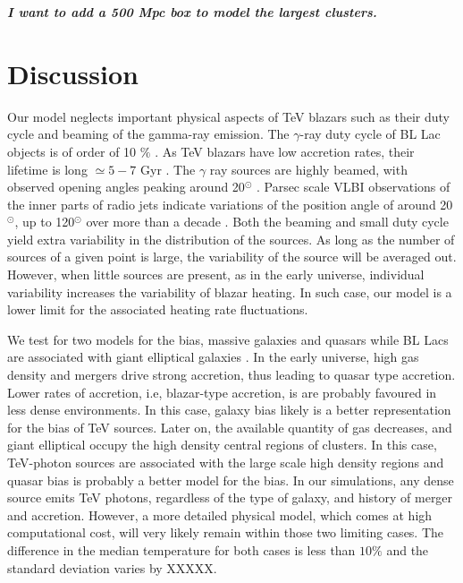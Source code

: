 \documentclass[twocolumns]{emulateapj}
\newcommand\ALc[1]{{\color{red} \bf #1}} %
\begin{document}
\ALc{\textit{I want to add a 500 Mpc box to model the largest clusters.}}
\ALc{
\section{Discussion}
Our model neglects important physical aspects of TeV blazars such as their duty cycle and  beaming of the gamma-ray emission. The  $\gamma$-ray duty cycle of BL Lac objects is of order of 10 $\%$ \citep{1996ApJ...464..600S}.  As TeV blazars have low accretion rates, their lifetime is long $\simeq 5-7$ Gyr \citep{2002ApJ...571..226C}.  The $\gamma$ ray sources are highly beamed, with observed opening angles peaking around 20$^{\odot}$ \citep{2009A&A...507L..33P}.  Parsec scale VLBI observations of the inner parts of radio jets indicate variations of the position angle of around 20$^{\odot}$, up to 120$^{\odot}$ over more than a decade \citep{2013AJ....146..120L}.   Both the beaming and small duty cycle yield extra variability in the distribution of the sources.   As long as the number  of sources of a given point is large, the variability of the source will be averaged out. However, when little sources are present, as in the early universe, individual variability increases the variability of blazar heating. In such case, our model is a lower limit for the associated heating rate fluctuations.

We test for two models for the bias, massive galaxies and quasars while BL Lacs are associated with giant elliptical galaxies \citep{2007A&A...476..723H}.  In the early universe, high gas density and mergers drive strong accretion, thus leading to quasar type accretion. Lower rates of accretion, i.e, blazar-type accretion,  is  are probably favoured in less dense environments. In this case, galaxy bias likely is a better representation for the bias of TeV sources. Later on, the available quantity of gas decreases, and giant elliptical occupy the high density central regions of clusters. In this case, TeV-photon sources are associated with the large scale high density regions and quasar bias is probably a better model for the bias. In our simulations, any dense source emits TeV photons, regardless of the type of galaxy, and history of merger and accretion.  However, a more detailed physical model, which comes at high computational cost, will very likely remain within those two limiting cases. The difference in the median temperature for both cases is less than $10\%$  and the standard deviation varies by XXXXX.



}
\end{document}
